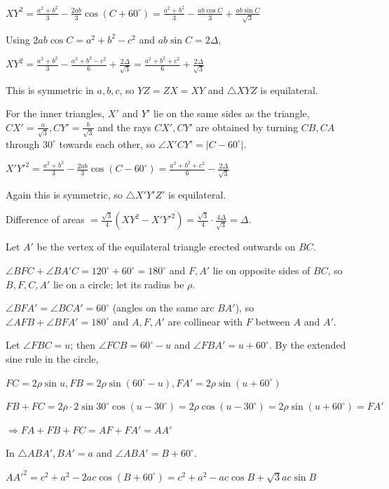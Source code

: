   $XY^2 = \frac{a^2 + b^2}{3} - \frac{2ab}{3}\cos(C + 60^\circ) = \frac{a^2 + b^2}{3} - \frac{ab\cos C}{3} +
  \frac{ab\sin C}{\sqrt{3}}$

  Using $2ab\cos C = a^2 + b^2 - c^2$ and $ab\sin C = 2\Delta$,

  $XY^2 = \frac{a^2 + b^2}{3} - \frac{a^2 + b^2 - c^2}{6} + \frac{2\Delta}{\sqrt{3}} = \frac{a^2 + b^2 +
  c^2}{6} + \frac{2\Delta}{\sqrt{3}}$

  This is symmetric in $a, b, c$, so $YZ = ZX = XY$ and $\triangle XYZ$ is equilateral.

  For the inner triangles, $X'$ and $Y'$ lie on the same sides as the triangle, $CX' = \frac{a}{\sqrt{3}},
  CY' = \frac{b}{\sqrt{3}}$ and the rays $CX', CY'$ are obtained by turning $CB, CA$ through $30^\circ$
  towards each other, so $\angle X'CY' = |C - 60^\circ|$.

  $X'Y'^2 = \frac{a^2 + b^2}{3} - \frac{2ab}{3}\cos(C - 60^\circ) = \frac{a^2 + b^2 + c^2}{6} -
  \frac{2\Delta}{\sqrt{3}}$

  Again this is symmetric, so $\triangle X'Y'Z'$ is equilateral.

  Difference of areas $= \frac{\sqrt{3}}{4}\left(XY^2 - X'Y'^2\right) =
  \frac{\sqrt{3}}{4}\cdot\frac{4\Delta}{\sqrt{3}} = \Delta$.
\item Let $A'$ be the vertex of the equilateral triangle erected outwards on $BC$.

  $\angle BFC + \angle BA'C = 120^\circ + 60^\circ = 180^\circ$ and $F, A'$ lie on opposite sides of $BC$, so
  $B, F, C, A'$ lie on a circle; let its radius be $\rho$.

  $\angle BFA' = \angle BCA' = 60^\circ$ (angles on the same arc $BA'$), so $\angle AFB + \angle BFA' =
  180^\circ$ and $A, F, A'$ are collinear with $F$ between $A$ and $A'$.

  Let $\angle FBC = u$; then $\angle FCB = 60^\circ - u$ and $\angle FBA' = u + 60^\circ$. By the extended
  sine rule in the circle,

  $FC = 2\rho\sin u, FB = 2\rho\sin(60^\circ - u), FA' = 2\rho\sin(u + 60^\circ)$

  $FB + FC = 2\rho\cdot2\sin30^\circ\cos(u - 30^\circ) = 2\rho\cos(u - 30^\circ) = 2\rho\sin(u + 60^\circ) =
  FA'$

  $\Rightarrow FA + FB + FC = AF + FA' = AA'$

  In $\triangle ABA', BA' = a$ and $\angle ABA' = B + 60^\circ$.

  $AA'^2 = c^2 + a^2 - 2ac\cos(B + 60^\circ) = c^2 + a^2 - ac\cos B + \sqrt{3}ac\sin B$

